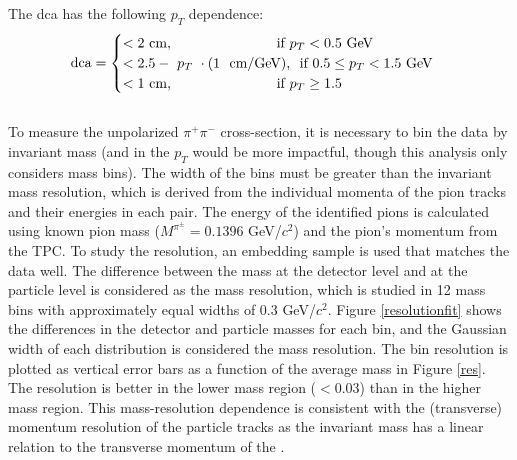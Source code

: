 The dca has the following $p_T$ dependence: \\
\[\text{dca} =
\begin{cases}
< 2 \text{\ cm, \hspace{0.2\linewidth} if  $p_T< 0.5$ GeV }\\
< 2.5 -\text{ $p_T\ \cdot (1\ \text{ cm/GeV})$,\hspace{0.01\linewidth} if $0.5\leq p_T < 1.5$ GeV}\\
< 1 \text{\ cm, \hspace{0.2\linewidth} if $p_T \geq 1.5$}\\
\end{cases}
\]\\
 To measure the unpolarized $\pi^+\pi^-$ cross-section, it is necessary to bin the data by invariant mass (and in the $p_T$ would be more impactful, though this analysis only considers mass bins). The width of the bins must be greater than the invariant mass resolution, which is derived from the individual momenta of the pion tracks and their energies in each pair. The energy of the identified pions is calculated using known pion mass ($M^{\pi^\pm} = 0.1396$ GeV/$c^2$) and the pion's momentum from the TPC. To study the resolution, an embedding sample is used that matches the data well. The difference between the \dipion mass at the detector level and at the particle level is considered as  the mass resolution, which is studied in 12 mass bins with approximately equal widths of 0.3 GeV/$c^2$. Figure \ref{resolutionfit} shows the differences in the detector and particle masses for each bin, and the Gaussian width of each distribution is considered the mass resolution. The bin resolution is plotted as vertical error bars as a function of the average mass in Figure \ref{res}. The resolution is better in the lower mass region ($<0.03$) than in the higher mass region. This mass-resolution dependence is consistent with the (transverse) momentum resolution of the particle tracks as the invariant mass has a linear relation to the transverse momentum of the \dipion. 

